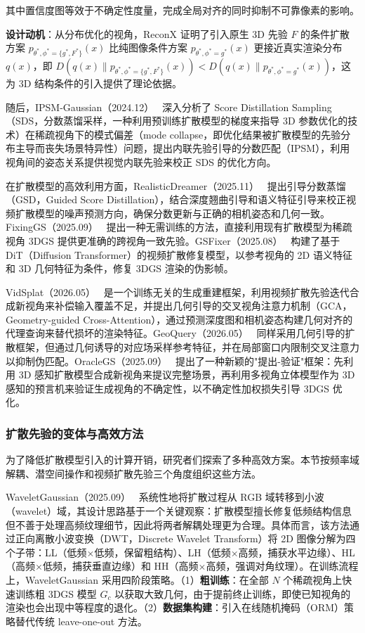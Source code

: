其中置信度图等效于不确定性度量，完成全局对齐的同时抑制不可靠像素的影响。

\textbf{设计动机}：从分布优化的视角，ReconX 证明了引入原生 3D 先验 $F$ 的条件扩散方案 $p_{\theta^*, \phi^*=\{g^*, F^*\}}(x)$ 比纯图像条件方案 $p_{\theta^*, \phi^*=g^*}(x)$ 更接近真实渲染分布 $q(x)$，即 $D(q(x) \| p_{\theta^*, \phi^*=\{g^*, F^*\}}(x)) < D(q(x) \| p_{\theta^*, \phi^*=g^*}(x))$，这为 3D 结构条件的引入提供了理论依据。

随后，IPSM-Gaussian（2024.12）~\cite{2412_02225} 深入分析了 Score Distillation Sampling（SDS，分数蒸馏采样，一种利用预训练扩散模型的梯度来指导 3D 参数优化的技术）在稀疏视角下的模式偏差（mode collapse，即优化结果被扩散模型的先验分布主导而丧失场景特异性）问题，提出内联先验引导的分数匹配（IPSM），利用视角间的姿态关系提供视觉内联先验来校正 SDS 的优化方向。

在扩散模型的高效利用方面，RealisticDreamer（2025.11）~\cite{2511_11213} 提出引导分数蒸馏（GSD，Guided Score Distillation），结合深度翘曲引导和语义特征引导来校正视频扩散模型的噪声预测方向，确保分数更新与正确的相机姿态和几何一致。FixingGS（2025.09）~\cite{2509_18759} 提出一种无需训练的方法，直接利用现有扩散模型为稀疏视角 3DGS 提供更准确的跨视角一致先验。GSFixer（2025.08）~\cite{2508_09667} 构建了基于 DiT（Diffusion Transformer）的视频扩散修复模型，以参考视角的 2D 语义特征和 3D 几何特征为条件，修复 3DGS 渲染的伪影帧。

VidSplat（2026.05）~\cite{2605_11424} 是一个训练无关的生成重建框架，利用视频扩散先验迭代合成新视角来补偿输入覆盖不足，并提出几何引导的交叉视角注意力机制（GCA，Geometry-guided Cross-Attention），通过预测深度图和相机姿态构建几何对齐的代理查询来替代损坏的渲染特征。GeoQuery（2026.05）~\cite{2605_12399} 同样采用几何引导的扩散框架，但通过几何诱导的对应场采样参考特征，并在局部窗口内限制交叉注意力以抑制伪匹配。OracleGS（2025.09）~\cite{2509_23258} 提出了一种新颖的"提出-验证"框架：先利用 3D 感知扩散模型合成新视角来提议完整场景，再利用多视角立体模型作为 3D 感知的预言机来验证生成视角的不确定性，以不确定性加权损失引导 3DGS 优化。

\subsubsection{扩散先验的变体与高效方法}

为了降低扩散模型引入的计算开销，研究者们探索了多种高效方案。本节按频率域解耦、潜空间操作和视频扩散先验三个角度组织这些方法。

WaveletGaussian（2025.09）~\cite{2509_19073} 系统性地将扩散过程从 RGB 域转移到小波（wavelet）域，其设计思路基于一个关键观察：扩散模型擅长修复低频结构信息但不善于处理高频纹理细节，因此将两者解耦处理更为合理。具体而言，该方法通过正向离散小波变换（DWT，Discrete Wavelet Transform）将 2D 图像分解为四个子带：LL（低频$\times$低频，保留粗结构）、LH（低频$\times$高频，捕获水平边缘）、HL（高频$\times$低频，捕获垂直边缘）和 HH（高频$\times$高频，强调对角纹理）。在训练流程上，WaveletGaussian 采用四阶段策略。（1）\textbf{粗训练}：在全部 $N$ 个稀疏视角上快速训练粗 3DGS 模型 $G_c$ 以获取大致几何，由于提前终止训练，即使已知视角的渲染也会出现中等程度的退化。（2）\textbf{数据集构建}：引入在线随机掩码（ORM）策略替代传统 leave-one-out 方法。

